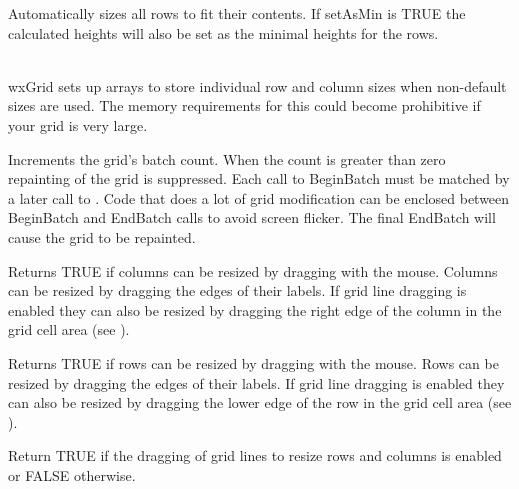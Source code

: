 Automatically sizes all rows to fit their contents. If setAsMin is TRUE the calculated heights will
also be set as the minimal heights for the rows.

\\
wxGrid sets up arrays to store individual row and column sizes when non-default sizes are used.
The memory requirements for this could become prohibitive if your grid is very large. 

\label{wxgridbeginbatch}


Increments the grid's batch count. When the count is greater than zero repainting of
the grid is suppressed. Each call to BeginBatch must be matched by a later call to 
. Code that does a lot of grid
modification can be enclosed between BeginBatch and EndBatch calls to avoid
screen flicker. The final EndBatch will cause the grid to be repainted.

\label{wxgridcandragcolsize}


Returns TRUE if columns can be resized by dragging with the mouse. Columns can be resized
by dragging the edges of their labels. If grid line dragging is enabled they can also be
resized by dragging the right edge of the column in the grid cell area 
(see ).

\label{wxgridcandragrowsize}


Returns TRUE if rows can be resized by dragging with the mouse. Rows can be resized
by dragging the edges of their labels. If grid line dragging is enabled they can also be
resized by dragging the lower edge of the row in the grid cell area 
(see ).

\label{wxgridcandraggridsize}


Return TRUE if the dragging of grid lines to resize rows and columns is enabled or FALSE otherwise.

\label{wxgridcanenablecellcontrol}

